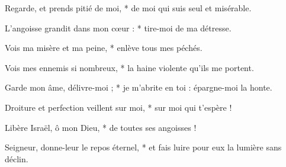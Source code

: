 \item Regarde, et prends pitié de moi, * de moi qui suis seul et misérable.

\item L'angoisse grandit dans mon cœur : * tire-moi de ma détresse.

\item Vois ma misère et ma peine, * enlève tous mes péchés.

\item Vois mes ennemis si nombreux, * la haine violente qu'ils me portent.

\item Garde mon âme, délivre-moi ; * je m'abrite en toi : épargne-moi la honte.

\item Droiture et perfection veillent sur moi, * sur moi qui t'espère !

\item Libère Israël, ô mon Dieu, * de toutes ses angoisses !

\item Seigneur, donne-leur le repos éternel, * et fais luire pour eux la lumière sans déclin.